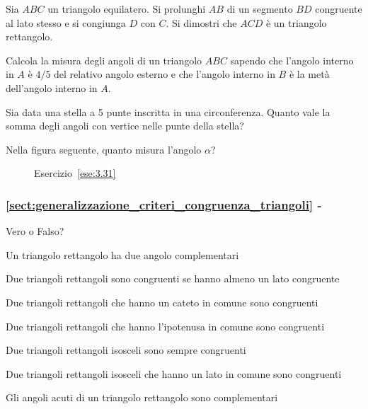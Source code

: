\begin{esercizio}
\label{ese:3.48}
Sia $ABC$ un triangolo equilatero. Si prolunghi $AB$ di un segmento $BD$ congruente al lato stesso e si congiunga $D$ con $C$. Si dimostri che $ACD$ è un triangolo rettangolo.
\end{esercizio}

\begin{esercizio}
\label{ese:3.49}
Calcola la misura degli angoli di un triangolo $ABC$ sapendo che l'angolo interno in $A$ è $4/5$ del relativo angolo esterno e che l'angolo interno in $B$ è la metà dell'angolo interno in $A$.
\end{esercizio}

\begin{esercizio}
\label{ese:3.50}
Sia data una stella a 5 punte inscritta in una circonferenza. Quanto vale la somma degli angoli con vertice nelle punte della stella? 
\end{esercizio}

\begin{esercizio}
\label{ese:3.51}
Nella figura seguente, quanto misura l'angolo $\alpha$?  
\end{esercizio}
\begin{figure}[htb]
\centering
\caption{Esercizio~\ref{ese:3.31}}\label{fig:ese3.51}
\end{figure}

\begingroup
\hypersetup{linkcolor=black}
\subsubsection*{\ref{sect:generalizzazione_criteri_congruenza_triangoli} - }
\endgroup

\begin{esercizio}
\label{ese:3.52}
Vero o Falso?
\begin{enumeratea}
\item Un triangolo rettangolo ha due angolo complementari\hfill\boxV\quad\boxF
\item Due triangoli rettangoli sono congruenti se hanno almeno un lato congruente\hfill\boxV\quad\boxF
\item Due triangoli rettangoli che hanno un cateto in comune sono congruenti\hfill\boxV\quad\boxF
\item Due triangoli rettangoli che hanno l'ipotenusa in comune sono congruenti\hfill\boxV\quad\boxF
\item Due triangoli rettangoli isosceli sono sempre congruenti\hfill\boxV\quad\boxF
\item Due triangoli rettangoli isosceli che hanno un lato in comune sono congruenti\hfill\boxV\quad\boxF
\item Gli angoli acuti di un triangolo rettangolo sono complementari\hfill\boxV\quad\boxF
\end{enumeratea}
\end{esercizio}

